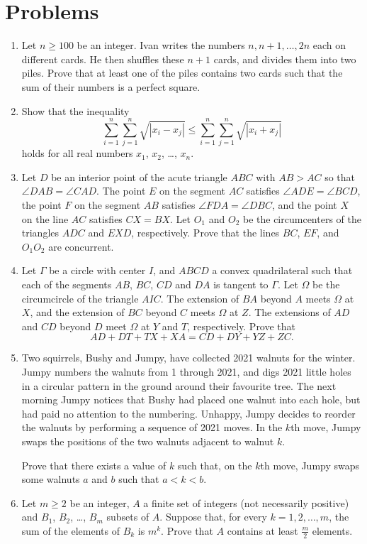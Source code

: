 \documentclass[11pt]{scrartcl}
\begin{document}
\section{Problems}
\begin{enumerate}[\bfseries 1.]
\item %
Let $n \ge 100$ be an integer.
Ivan writes the numbers $n, n+1, \dots, 2n$ each on different cards.
He then shuffles these $n+1$ cards, and divides them into two piles.
Prove that at least one of the piles contains two cards such that
the sum of their numbers is a perfect square.

\item %
Show that the inequality
\[\sum_{i=1}^n \sum_{j=1}^n \sqrt{|x_i-x_j|}
  \le \sum_{i=1}^n \sum_{j=1}^n \sqrt{|x_i+x_j|} \]
holds for all real numbers $x_1$, $x_2$, \dots, $x_n$.

\item %
Let $D$ be an interior point of the acute triangle $ABC$
with $AB > AC$ so that $\angle DAB = \angle CAD$.
The point $E$ on the segment $AC$ satisfies $\angle ADE =\angle BCD$,
the point $F$ on the segment $AB$ satisfies $\angle FDA =\angle DBC$,
and the point $X$ on the line $AC$ satisfies $CX = BX$.
Let $O_1$ and $O_2$ be the circumcenters of the triangles
$ADC$ and $EXD$, respectively.
Prove that the lines $BC$, $EF$, and $O_1O_2$ are concurrent.

\item %
Let $\Gamma$ be a circle with center $I$, and $ABCD$ a convex quadrilateral
such that each of the segments $AB$, $BC$, $CD$ and $DA$ is tangent to $\Gamma$.
Let $\Omega$ be the circumcircle of the triangle $AIC$.
The extension of $BA$ beyond $A$ meets $\Omega$ at $X$,
and the extension of $BC$ beyond $C$ meets $\Omega$ at $Z$.
The extensions of $AD$ and $CD$ beyond $D$ meet $\Omega$ at $Y$ and $T$, respectively.
Prove that
\[ AD + DT + TX + XA = CD + DY + YZ + ZC. \]

\item %
Two squirrels, Bushy and Jumpy, have collected 2021 walnuts for the winter.
Jumpy numbers the walnuts from 1 through 2021, and digs 2021 little holes
in a circular pattern in the ground around their favourite tree.
The next morning Jumpy notices that Bushy had placed one walnut into each hole,
but had paid no attention to the numbering.
Unhappy, Jumpy decides to reorder the walnuts by performing a sequence of 2021 moves.
In the $k$th move, Jumpy swaps the positions of the two walnuts adjacent to walnut $k$.

Prove that there exists a value of $k$ such that, on the $k$th move,
Jumpy swaps some walnuts $a$ and $b$ such that $a<k<b$.

\item %
Let $m \ge 2$ be an integer,
$A$ a finite set of integers (not necessarily positive)
and $B_1$, $B_2$, \dots, $B_m$ subsets of $A$.
Suppose that, for every $k=1,2,\dots,m$,
the sum of the elements of $B_k$ is $m^k$.
Prove that $A$ contains at least $\frac{m}{2}$ elements.

\end{enumerate}
\pagebreak
\end{document}
